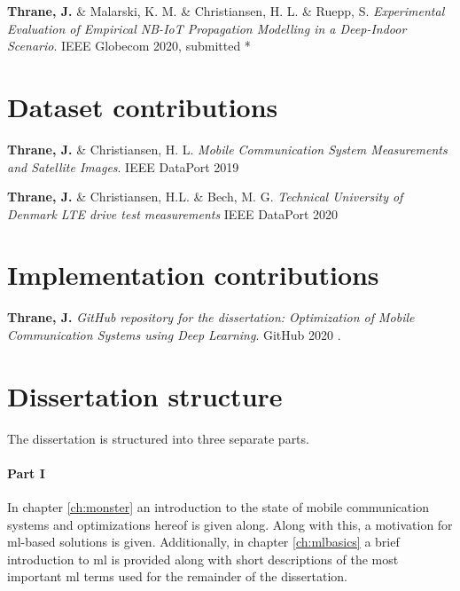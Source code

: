 \vspace{2em}
\noindent \textbf{Thrane, J.} \&  Malarski, K. M. \& Christiansen, H. L. \& Ruepp, S. \textit{Experimental Evaluation of Empirical NB-IoT Propagation Modelling in a Deep-Indoor Scenario}. IEEE Globecom 2020, submitted \cite{Thrane2020ExperimentalScenario} *


\section*{Dataset contributions}

\noindent \textbf{Thrane, J.} \& Christiansen, H. L. \textit{Mobile Communication System Measurements and Satellite Images}. IEEE DataPort 2019 \cite{1xf4-eg98-19}

\vspace{2em}
\noindent \textbf{Thrane, J.} \& Christiansen, H.L. \& Bech, M. G. \textit{Technical University of Denmark LTE drive test measurements} IEEE DataPort 2020 \cite{keyt-8g44-20}

\section*{Implementation contributions}

\noindent \textbf{Thrane, J.} \textit{GitHub repository for the dissertation: Optimization of Mobile Communication Systems using Deep Learning}. GitHub 2020 \cite{Thrane2020RepositoryLearning}.


\section*{Dissertation structure}
 
The dissertation is structured into three separate parts. 

\paragraph{Part I} In chapter \ref{ch:monster} an introduction to the state of mobile communication systems and optimizations hereof is given along. Along with this, a motivation for \gls{ml}-based solutions is given. Additionally, in chapter \ref{ch:mlbasics} a brief introduction to \gls{ml} is provided along with short descriptions of the most important \gls{ml} terms used for the remainder of the dissertation. 

